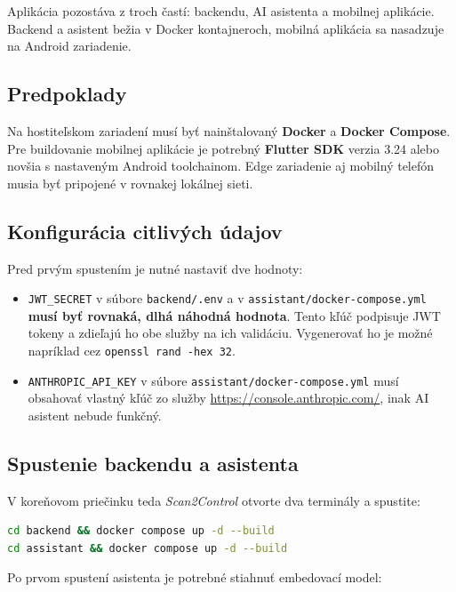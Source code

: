 
Aplikácia pozostáva z troch častí: backendu, AI asistenta a mobilnej aplikácie. Backend a asistent bežia v Docker kontajneroch, mobilná aplikácia sa nasadzuje na Android zariadenie.

\subsection*{Predpoklady}

Na hostiteľskom zariadení musí byť nainštalovaný \textbf{Docker} a \textbf{Docker Compose}. Pre buildovanie mobilnej aplikácie je potrebný \textbf{Flutter SDK} verzia 3.24 alebo novšia s nastaveným Android toolchainom. Edge zariadenie aj mobilný telefón musia byť pripojené v rovnakej lokálnej sieti.

\subsection*{Konfigurácia citlivých údajov}

Pred prvým spustením je nutné nastaviť dve hodnoty:

\begin{itemize}
      \item \texttt{JWT\_SECRET} v súbore \texttt{backend/.env} a v \texttt{assistant/docker-compose.yml} \textbf{musí byť rovnaká, dlhá náhodná hodnota}. Tento kľúč podpisuje JWT tokeny a zdieľajú ho obe služby na ich validáciu. Vygenerovať ho je možné napríklad cez \texttt{openssl rand -hex 32}.
      \item \texttt{ANTHROPIC\_API\_KEY} v súbore \texttt{assistant/docker-compose.yml} musí obsahovať vlastný kľúč zo služby \url{https://console.anthropic.com/}, inak AI asistent nebude funkčný.
\end{itemize}

\subsection*{Spustenie backendu a asistenta}

V koreňovom priečinku teda \textit{Scan2Control} otvorte dva terminály a spustite:

\begin{lstlisting}[style=code-listing, language=bash]
cd backend && docker compose up -d --build
cd assistant && docker compose up -d --build
\end{lstlisting}

Po prvom spustení asistenta je potrebné stiahnuť embedovací model:

